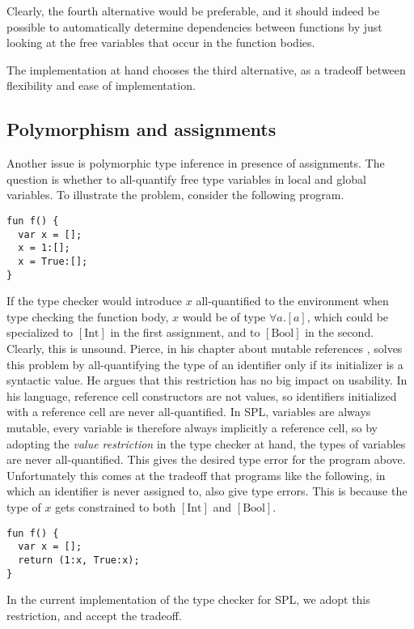 \documentclass[a4paper]{article}
\begin{document}
Clearly, the fourth alternative would be preferable, and it should indeed be
possible to automatically determine dependencies between functions by just
looking at the free variables that occur in the function bodies.

The implementation at hand chooses the third alternative, as a tradeoff between
flexibility and ease of implementation.

\subsection{Polymorphism and assignments}

Another issue is polymorphic type inference in presence of assignments.  The
question is whether to all-quantify free type variables in local and global
variables.  To illustrate the problem, consider the following program.

\begin{verbatim}
fun f() {
  var x = [];
  x = 1:[];
  x = True:[];
}
\end{verbatim}

If the type checker would introduce $x$ all-quantified to the environment when
type checking the function body, $x$ would be of type $\forall a . [a]$, which
could be specialized to $[\text{Int}]$ in the first assignment, and to
$[\text{Bool}]$ in the second.  Clearly, this is unsound.  Pierce, in his
chapter about mutable references \cite{Pierce2002a}, solves this problem by
all-quantifying the type of an identifier only if its initializer is a syntactic
value.  He argues that this restriction has no big impact on usability.  In his
language, reference cell constructors are not values, so identifiers initialized
with a reference cell are never all-quantified.  In SPL, variables are always
mutable, every variable is therefore always implicitly a reference cell, so by
adopting the \emph{value restriction} in the type checker at hand, the types of
variables are never all-quantified.  This gives the desired type error for the
program above. Unfortunately this comes at the tradeoff that programs like the
following, in which an identifier is never assigned to, also give type errors.
This is because the type of $x$ gets constrained to both $[\text{Int}]$ and
$[\text{Bool}]$.

\begin{verbatim}
fun f() {
  var x = [];
  return (1:x, True:x);
}
\end{verbatim}

In the current implementation of the type checker for SPL, we adopt this
restriction, and accept the tradeoff.
\end{document}
